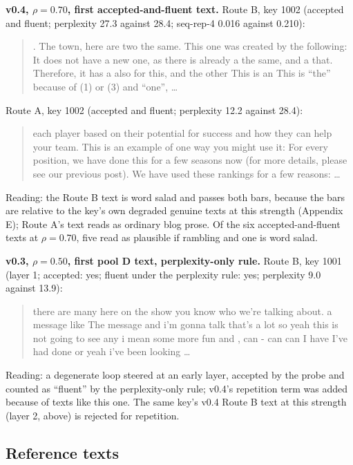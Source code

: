 \documentclass[11pt,letterpaper]{article}
\begin{document}
\textbf{v0.4, \(\rho = 0.70\), first accepted-and-fluent text.} Route B, key 1002 (accepted and fluent; perplexity 27.3 against 28.4; seq-rep-4 0.016 against 0.210):

\begin{quote}
. The town, here are two the same. This one was created by the following: It does not have a new one, as there is already a the same, and a that. Therefore, it has a also for this, and the other This is an This is ``the'' because of (1) or (3) and ``one'', \ldots{}
\end{quote}

Route A, key 1002 (accepted and fluent; perplexity 12.2 against 28.4):

\begin{quote}
each player based on their potential for success and how they can help your team. This is an example of one way you might use it: For every position, we have done this for a few seasons now (for more details, please see our previous post). We have used these rankings for a few reasons: \ldots{}
\end{quote}

Reading: the Route B text is word salad and passes both bars, because the bars are relative to the key's own degraded genuine texts at this strength (Appendix E); Route A's text reads as ordinary blog prose. Of the six accepted-and-fluent texts at \(\rho = 0.70\), five read as plausible if rambling and one is word salad.

\textbf{v0.3, \(\rho = 0.50\), first pool D text, perplexity-only rule.} Route B, key 1001 (layer 1; accepted: yes; fluent under the perplexity rule: yes; perplexity 9.0 against 13.9):

\begin{quote}
there are many here on the show you know who we're talking about. a message like The message and i'm gonna talk that's a lot so yeah this is not going to see any i mean some more fun and , can - can can I have I've had done or yeah i've been looking \ldots{}
\end{quote}

Reading: a degenerate loop steered at an early layer, accepted by the probe and counted as ``fluent'' by the perplexity-only rule; v0.4's repetition term was added because of texts like this one. The same key's v0.4 Route B text at this strength (layer 2, above) is rejected for repetition.

\hypertarget{reference-texts}{%
\subsection{Reference texts}\label{reference-texts}}
\end{document}
